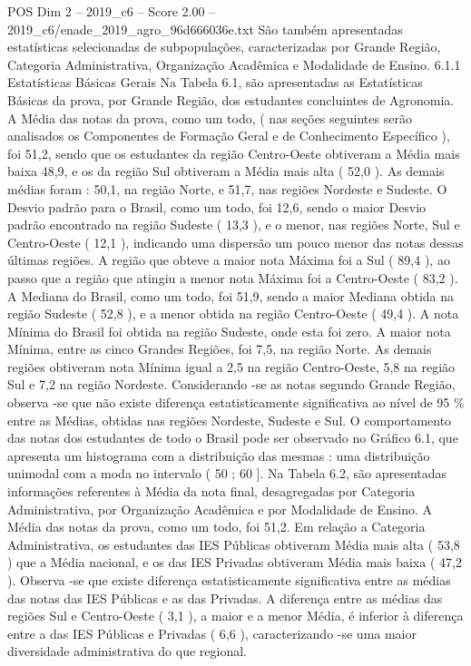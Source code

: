 \begin{textsample}{POS Dim 2 – 2019\_c6 – Score 2.00 – 2019\_c6/enade\_2019\_agro\_96d666036e.txt}
São também apresentadas estatísticas selecionadas de subpopulações, caracterizadas por Grande Região, Categoria Administrativa, Organização Acadêmica e Modalidade de Ensino. 6.1.1 Estatísticas Básicas Gerais Na Tabela 6.1, são apresentadas as Estatísticas Básicas da prova, por Grande Região, dos estudantes concluintes de Agronomia.
A Média das notas da prova, como um todo, ( nas seções seguintes serão analisados os Componentes de Formação Geral e de Conhecimento Específico ), foi 51,2, sendo que os estudantes da região Centro-Oeste obtiveram a Média mais baixa 48,9, e os da região Sul obtiveram a Média mais alta ( 52,0 ).
As demais médias foram : 50,1, na região Norte, e 51,7, nas regiões Nordeste e Sudeste.
O Desvio padrão para o Brasil, como um todo, foi 12,6, sendo o maior Desvio padrão encontrado na região Sudeste ( 13,3 ), e o menor, nas regiões Norte, Sul e Centro-Oeste ( 12,1 ), indicando uma dispersão um pouco menor das notas dessas últimas regiões.
A região que obteve a maior nota Máxima foi a Sul ( 89,4 ), ao passo que a região que atingiu a menor nota Máxima foi a Centro-Oeste ( 83,2 ).
A Mediana do Brasil, como um todo, foi 51,9, sendo a maior Mediana obtida na região Sudeste ( 52,8 ), e a menor obtida na região Centro-Oeste ( 49,4 ).
A nota Mínima do Brasil foi obtida na região Sudeste, onde esta foi zero.
A maior nota Mínima, entre as cinco Grandes Regiões, foi 7,5, na região Norte.
As demais regiões obtiveram nota Mínima igual a 2,5 na região Centro-Oeste, 5,8 na região Sul e 7,2 na região Nordeste.
Considerando -se as notas segundo Grande Região, observa -se que não existe diferença estatisticamente significativa ao nível de 95 \% entre as Médias, obtidas nas regiões Nordeste, Sudeste e Sul.
O comportamento das notas dos estudantes de todo o Brasil pode ser observado no Gráfico 6.1, que apresenta um histograma com a distribuição das mesmas : uma distribuição unimodal com a moda no intervalo ( 50 ; 60 ].
Na Tabela 6.2, são apresentadas informações referentes à Média da nota final, desagregadas por Categoria Administrativa, por Organização Acadêmica e por Modalidade de Ensino.
A Média das notas da prova, como um todo, foi 51,2.
Em relação a Categoria Administrativa, os estudantes das IES Públicas obtiveram Média mais alta ( 53,8 ) que a Média nacional, e os das IES Privadas obtiveram Média mais baixa ( 47,2 ).
Observa -se que existe diferença estatisticamente significativa entre as médias das notas das IES Públicas e as das Privadas.
A diferença entre as médias das regiões Sul e Centro-Oeste ( 3,1 ), a maior e a menor Média, é inferior à diferença entre a das IES Públicas e Privadas ( 6,6 ), caracterizando -se uma maior diversidade administrativa do que regional.

\end{textsample}
